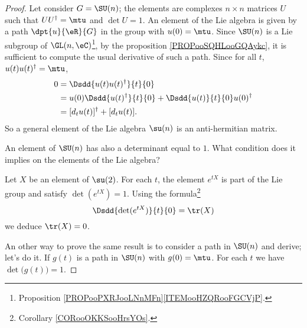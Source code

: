 \begin{proof}
	Let consider $G=\SU(n)$; the elements are complexes $n\times n$ matrices $U$ such that $UU^{\dag}=\mtu$ and $\det U=1$. An element of the Lie algebra is given by a path $\dpt{u}{\eR}{G}$ in the group with $u(0)=\mtu$. Since \( \SU(n)\) is a Lie subgroup of \( \GL(n,\eC)\)\footnote{Proposition \ref{PROPooPXRJooLNnMFn}\ref{ITEMooHZQRooFGCVjP}.}, by the proposition \ref{PROPooSQHLooGQAykc}, it is sufficient to compute the usual derivative of such a path.
	Since for all $t$, $u(t)u(t)^{\dag}=\mtu$,
	\begin{subequations}
		\begin{align}
			0 & =\Dsdd{u(t)u(t)^{\dag}}{t}{0}                              \\
			  & =u(0)\Dsdd{u(t)^{\dag}}{t}{0}+\Dsdd{u(t)}{t}{0}u(0)^{\dag} \\
			  & =[d_tu(t)]^{\dag}+[d_tu(t)].
		\end{align}
	\end{subequations}
	So a general element of the Lie algebra $\su(n)$ is an anti-hermitian matrix.

	An element of \( \SU(n)\) has also a determinant equal to \( 1\). What condition does it implies on the elements of the Lie algebra?

	Let \( X\) be an element of \( \su(2)\). For each \( t\), the element \(  e^{tX}\) is part of the Lie group and satisfy \( \det( e^{tX})=1\). Using the formula\footnote{Corollary \ref{CORooOKKSooHrsYOs}.}
	\begin{equation}
		\Dsdd{ \det( e^{tX}) }{t}{0}=\tr(X)
	\end{equation}
	we deduce \( \tr(X)=0\).

	An other way to prove the same result is to consider a path in \( \SU(n)\) and derive; let's do it. If \( g(t)\) is a path in \( \SU(n)\) with \( g(0)=\mtu\). For each \( t\) we have \( \det\big( g(t) \big)=1\).


\end{proof}
